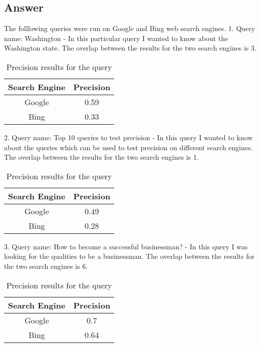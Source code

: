\documentclass[letterpaper,11pt]{article}
\begin{document}
\subsection*{Answer}

The folllowing queries were run on Google and Bing web search engines.
1. Query name: Washington - In this particular query I wanted to know about the Washington state. The overlap between the results for the two search engines is 3.

\begin{table}[h]
\centering
\begin{adjustbox}{max width=\linewidth}
\begin{tabular}{ | c | c | }
\hline
\textbf{Search Engine} & \textbf{Precision}  \\
\hline
Google & 0.59 \\ 
\hline
Bing & 0.33 \\ 
\hline
\end{tabular}
\end{adjustbox}
\caption{Precision results for the query}
\label{table:q3calcs}
\end{table} 

2. Query name: Top 10 queries to test precision - In this query I wanted to know about the queries which can be used to test precision on different search engines. The overlap between the results for the two search engines is 1.

\begin{table}[h]
\centering
\begin{adjustbox}{max width=\linewidth}
\begin{tabular}{ | c | c | }
\hline
\textbf{Search Engine} & \textbf{Precision}  \\
\hline
Google &  0.49\\ 
\hline
Bing & 0.28 \\ 
\hline
\end{tabular}
\end{adjustbox}
\caption{Precision results for the query}
\label{table:q3calcs}
\end{table} 

3. Query name: How to become a successful businessman? - In this query I was looking for the qualities to be a businessman. The overlap between the results for the two search engines is 6.

\begin{table}[h]
\centering
\begin{adjustbox}{max width=\linewidth}
\begin{tabular}{ | c | c | }
\hline
\textbf{Search Engine} & \textbf{Precision}  \\
\hline
Google &  0.7 \\ 
\hline
Bing & 0.64 \\ 
\hline
\end{tabular}
\end{adjustbox}
\caption{Precision results for the query}
\label{table:q3calcs}
\end{table} 
\end{document}
